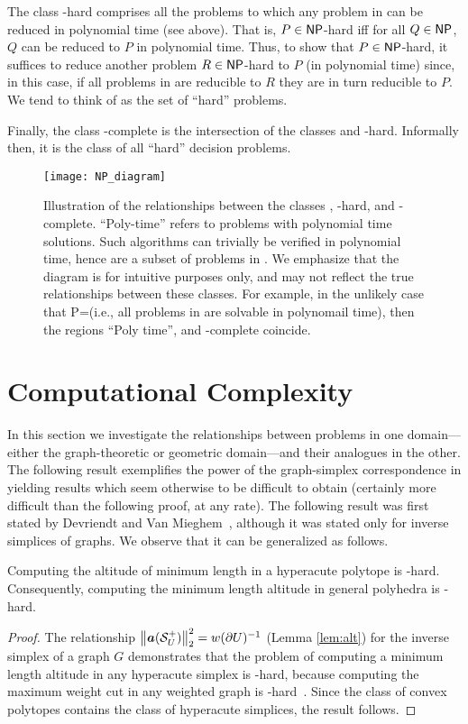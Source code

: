 The class \NP-hard comprises all the problems to  which  any problem in \NP can be reduced in polynomial time (see above). That is, $P\in{\normalfont\textsf{NP}}$-hard iff for all  $Q\in{\normalfont\textsf{NP}}$,  $Q$ can be  reduced to $P$ in polynomial time. Thus,  to show that $P\in{\normalfont\textsf{NP}}$-hard, it suffices to reduce another problem $R\in{\normalfont\textsf{NP}}$-hard to  $P$ (in polynomial time) since,  in this  case, if all problems in \NP are  reducible  to  $R$  they are in turn  reducible  to  $P$. We  tend to think of \NP as the set of ``hard'' problems. 

Finally,  the class \NP-complete is the intersection of the classes \NP and  \NP-hard. Informally then, it is  the  class of all ``hard'' decision problems. 

\begin{figure}
	\centering
	\texttt{[image: NP\_diagram]}
	\caption{Illustration of the relationships between the  classes \NP,  \NP-hard, and \NP-complete. ``Poly-time'' refers to problems with polynomial time solutions. Such algorithms can trivially be verified  in polynomial time, hence  are a  subset of problems in \NP. We emphasize that the diagram is  for intuitive purposes only,  and may not reflect the true relationships between these classes. For example, in  the unlikely  case that \textsf{P}=\NP (i.e., all problems in  \NP are solvable in polynomail time), then the regions ``Poly time'', \NP and \NP-complete coincide.}
\end{figure}



\section{Computational Complexity}
\label{sec:algorithmics_complexity}

In this section we investigate the relationships between problems in one domain---either the graph-theoretic or geometric domain---and their analogues in the other. The following result exemplifies the power of the graph-simplex correspondence in yielding results which seem otherwise to be difficult to obtain (certainly more difficult than the following proof, at any rate).  
The following result was first stated by Devriendt and Van Mieghem~\cite{devriendt2018simplex}, although it was stated only for inverse simplices of graphs. We observe that it can be generalized as follows. 

\begin{lemma}
	\label{lem:altitude_hard}
	Computing the altitude of minimum length in a hyperacute polytope is \NP-hard. Consequently, computing the minimum length altitude in general polyhedra is \NP-hard. 
\end{lemma}
\begin{proof}
	The relationship $\norm{\vb*{a}(\mathcal{S}^+_U)}_2^2 = w(\partial U)^{-1}$ (Lemma \ref{lem:alt}) for the inverse simplex of a graph $G$ demonstrates that the problem of computing a minimum length altitude in any hyperacute simplex is \NP-hard, because computing the  maximum weight cut in any weighted graph is \NP-hard~\cite{karp1972reducibility}.  Since the class of convex polytopes contains the class of hyperacute simplices, the result follows. 
\end{proof}

